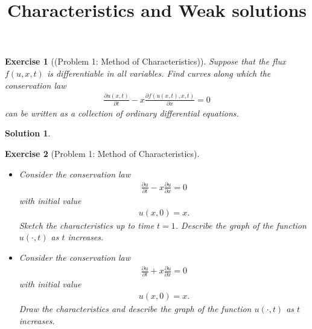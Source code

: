 \documentclass[10pt,letterpaper]{article}
\theoremstyle{break}
\newtheorem{exercise}{Exercise}
\newtheorem{mysolution}{Solution}
\newenvironment{solution}{\begin{mysolution}}{\end{mysolution}}
\begin{document}
\title{Characteristics and Weak solutions}
\date{}




















\begin{exercise}[(Problem 1: Method of Characteristics)]

	Suppose that the flux $f(u,x,t)$ is differentiable in all variables.
	Find curves along which the conservation law 
	\begin{align}
		\frac{\partial u(x,t)}{\partial t}
		-
		x
		\frac{\partial f(u(x,t),x,t)}{\partial x}
		= 0
	\end{align}
	can be written as a collection of ordinary differential equations.
\end{exercise}

\begin{solution}
	
\end{solution}
	











\begin{exercise}[Problem 1: Method of Characteristics]
	${}$%
	\begin{itemize}
	\item[(i)] Consider the conservation law 
	\begin{align}
		\frac{\partial u}{\partial t}
		-
		x
		\frac{\partial u}{\partial x}
		= 0
	\end{align}
	with initial value
	\begin{align}
		u(x,0)=x.
	\end{align}
	Sketch the characteristics up to time $t=1$. Describe the graph of the function $u(\cdot,t)$
	as $t$ increases.
	\item[(ii)] Consider the conservation law
	\begin{align}
		\frac{\partial u}{\partial t}
		+
		x
		\frac{\partial u}{\partial x}
		= 0
	\end{align}
	with initial value
	\begin{align}
		u(x,0)=x.
	\end{align}
	Draw the characteristics and describe the graph of the function $u(\cdot,t)$ as $t$ increases.
	\end{itemize}
\end{exercise}
\end{document}
